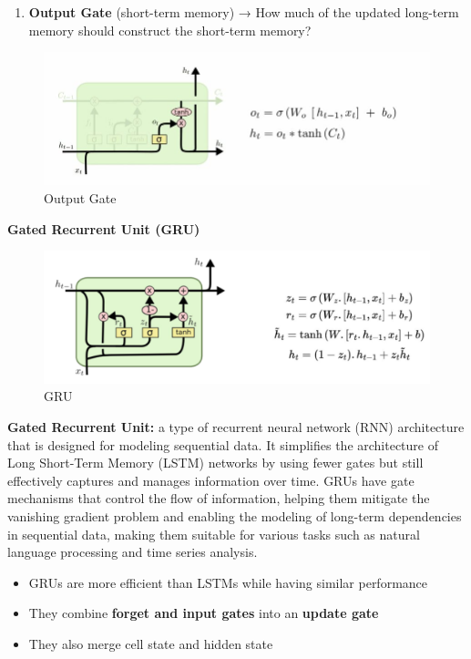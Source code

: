 \begin{enumerate}
\begin{enumerate}
\end{enumerate}
\item \textbf{Output Gate} (short-term memory) → How much of the updated long-term memory
should construct the short-term memory?
\end{enumerate}

\begin{figure}[h!t]
    \centering
    \includegraphics[width=0.8\linewidth]{outputgate.png}
    \caption{Output Gate}
    \label{fig:enter-label}
\end{figure}

\textbf{Gated Recurrent Unit (GRU)}

\begin{figure}[h!t]
    \centering
    \includegraphics[width=0.75\linewidth]{GRU.png}
    \caption{GRU}
    \label{fig:enter-label}
\end{figure}

\begin{definition}
    \textbf{Gated Recurrent Unit:} a type of recurrent neural network (RNN) architecture that is designed for modeling sequential data. It simplifies the architecture of Long Short-Term Memory (LSTM) networks by using fewer gates but still effectively captures and manages information over time. GRUs have gate mechanisms that control the flow of information, helping them mitigate the vanishing gradient problem and enabling the modeling of long-term dependencies in sequential data, making them suitable for various tasks such as natural language processing and time series analysis.
\end{definition}

\begin{itemize}
    \item GRUs are more efficient than LSTMs while having similar performance
    \item They combine \textbf{forget and input gates} into an \textbf{update gate}
    \item They also merge cell state and hidden state\\
\end{itemize}

